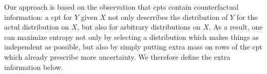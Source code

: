 \documentclass{article}
\newcommand{\commentout}[1]{\ignorespaces}
\numberwithin{equation}{section}
\begin{document}
% 
        
Our approach is based on the observation that cpts contain
counterfactual information:  
	a cpt for $Y$ given $X$ not only descrribes the distribution of $Y$
        for the actul distribution on $X$, but also for
        arbitrary distributions on $X$.
        As a result, one can maximize
        entropy not only by selecting a distribution which makes
        things as independent as possible, but also by simply putting
        extra mass on rows of the cpt which already prescribe more
        uncertainty. We therefore define the extra information below. 
	
\end{document}
